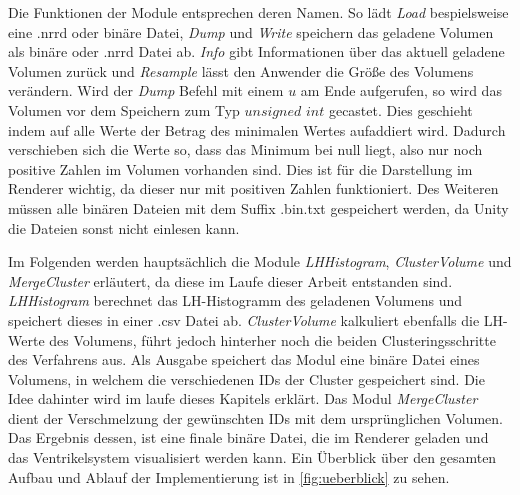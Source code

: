 Die Funktionen der Module entsprechen deren Namen. So lädt \textit{Load} bespielsweise eine .nrrd oder binäre Datei, \textit{Dump} und \textit{Write} speichern das geladene Volumen als binäre oder .nrrd Datei ab. \textit{Info} gibt Informationen über das aktuell geladene Volumen zurück und \textit{Resample} lässt den Anwender die Größe des Volumens verändern.
\newline
Wird der \textit{Dump} Befehl mit einem $u$ am Ende aufgerufen, so wird das Volumen vor dem Speichern zum Typ $unsigned$ $int$ gecastet. Dies geschieht indem auf alle Werte der Betrag des minimalen Wertes aufaddiert wird. Dadurch verschieben sich die Werte so, dass das Minimum bei null liegt, also nur noch positive Zahlen im Volumen vorhanden sind. Dies ist für die Darstellung im Renderer wichtig, da dieser nur mit positiven Zahlen funktioniert. Des Weiteren müssen alle binären Dateien mit dem Suffix .bin.txt gespeichert werden, da Unity die Dateien sonst nicht einlesen kann.


Im Folgenden werden hauptsächlich die Module \textit{LHHistogram}, \textit{ClusterVolume} und \textit{MergeCluster} erläutert, da diese im Laufe dieser Arbeit entstanden sind. \textit{LHHistogram} berechnet das LH-Histogramm des geladenen Volumens und speichert dieses in einer .csv Datei ab.
\newline
\textit{ClusterVolume} kalkuliert ebenfalls die LH-Werte des Volumens, führt jedoch hinterher noch die beiden Clusteringsschritte des Verfahrens aus. Als Ausgabe speichert das Modul eine binäre Datei eines Volumens, in welchem die verschiedenen IDs der Cluster gespeichert sind. Die Idee dahinter wird im laufe dieses Kapitels erklärt.
\newline
Das Modul \textit{MergeCluster} dient der Verschmelzung der gewünschten IDs mit dem ursprünglichen Volumen. Das Ergebnis dessen, ist eine finale binäre Datei, die im Renderer geladen und das Ventrikelsystem visualisiert werden kann. Ein Überblick über den gesamten Aufbau und Ablauf der Implementierung ist in  \autoref{fig:ueberblick} zu sehen.

